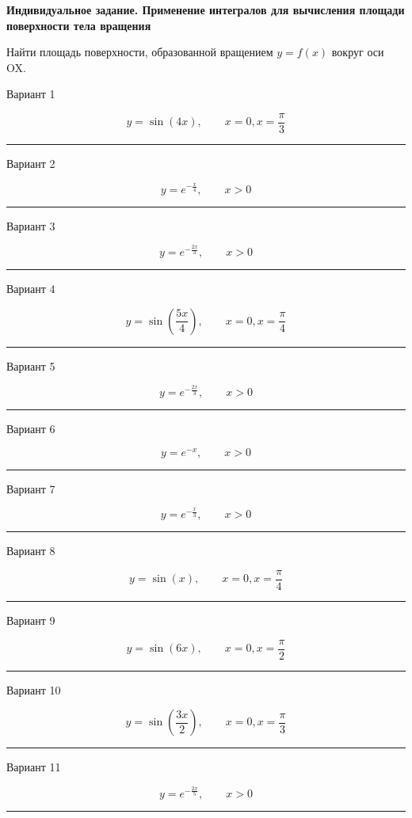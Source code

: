 \documentclass[11pt]{report}
\begin{document}
\pagestyle{empty}

{\bf Индивидуальное задание. Применение интегралов для вычисления площади поверхности тела вращения}


Найти площадь поверхности, образованной вращением $y = f(x)$ вокруг оси OX.

Вариант 1

$$y=\sin{\left(4 x \right)}, \qquad x = 0, x = \frac{\pi}{3}$$

\rule{\textwidth}{.2mm}

Вариант 2

$$y=e^{- \frac{x}{4}}, \qquad x > 0$$

\rule{\textwidth}{.2mm}

Вариант 3

$$y=e^{- \frac{2 x}{3}}, \qquad x > 0$$

\rule{\textwidth}{.2mm}

Вариант 4

$$y=\sin{\left(\frac{5 x}{4} \right)}, \qquad x = 0, x = \frac{\pi}{4}$$

\rule{\textwidth}{.2mm}

Вариант 5

$$y=e^{- \frac{2 x}{3}}, \qquad x > 0$$

\rule{\textwidth}{.2mm}

Вариант 6

$$y=e^{- x}, \qquad x > 0$$

\rule{\textwidth}{.2mm}

Вариант 7

$$y=e^{- \frac{x}{3}}, \qquad x > 0$$

\rule{\textwidth}{.2mm}

Вариант 8

$$y=\sin{\left(x \right)}, \qquad x = 0, x = \frac{\pi}{4}$$

\rule{\textwidth}{.2mm}

Вариант 9

$$y=\sin{\left(6 x \right)}, \qquad x = 0, x = \frac{\pi}{2}$$

\rule{\textwidth}{.2mm}

Вариант 10

$$y=\sin{\left(\frac{3 x}{2} \right)}, \qquad x = 0, x = \frac{\pi}{3}$$

\rule{\textwidth}{.2mm}

Вариант 11

$$y=e^{- \frac{2 x}{5}}, \qquad x > 0$$

\rule{\textwidth}{.2mm}
\end{document}

